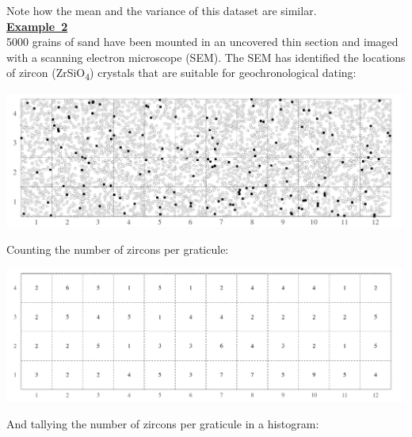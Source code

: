 Note how the mean and the variance of this dataset are similar.\\

\noindent\textbf{\underline{Example~2}}\\

5000 grains of sand have been mounted in an uncovered thin section and
imaged with a scanning electron microscope (SEM). The SEM has
identified the locations of zircon (ZrSiO\textsubscript{4}) crystals
that are suitable for geochronological dating:

\noindent\includegraphics[width=\textwidth]{../figures/zircons.pdf}
\begingroup {}
\label{fig:zircons}
\endgroup

Counting the number of zircons per graticule:

\noindent\includegraphics[width=\textwidth]{../figures/zirconcounts.pdf}
\begingroup {}
\label{fig:zirconcounts}\endgroup

And tallying the number of zircons per graticule in a histogram:

